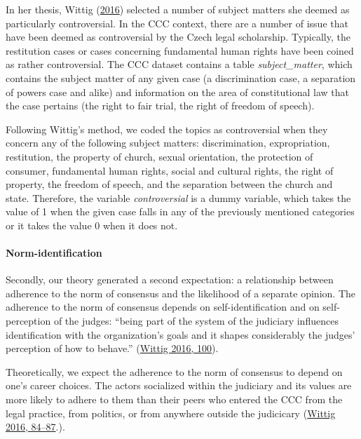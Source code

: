 \documentclass[
  11pt,
]{article}
\begin{document}
In her thesis, Wittig
(\protect\hyperlink{ref-wittigOccurrenceSeparateOpinions2016}{2016})
selected a number of subject matters she deemed as particularly
controversial. In the CCC context, there are a number of issue that have
been deemed as controversial by the Czech legal scholarship. Typically,
the restitution cases or cases concerning fundamental human rights have
been coined as rather controversial. The CCC dataset contains a table
\emph{subject\_matter}, which contains the subject matter of any given
case (a discrimination case, a separation of powers case and alike) and
information on the area of constitutional law that the case pertains
(the right to fair trial, the right of freedom of speech).

Following Wittig's method, we coded the topics as controversial when
they concern any of the following subject matters: discrimination,
expropriation, restitution, the property of church, sexual orientation,
the protection of consumer, fundamental human rights, social and
cultural rights, the right of property, the freedom of speech, and the
separation between the church and state. Therefore, the variable
\emph{controversial} is a dummy variable, which takes the value of 1
when the given case falls in any of the previously mentioned categories
or it takes the value 0 when it does not.

\hypertarget{norm-identification}{%
\paragraph*{Norm-identification}\label{norm-identification}}

Secondly, our theory generated a second expectation: a relationship
between adherence to the norm of consensus and the likelihood of a
separate opinion. The adherence to the norm of consensus depends on
self-identification and on self-perception of the judges: ``being part
of the system of the judiciary influences identification with the
organization's goals and it shapes considerably the judges' perception
of how to behave.''
(\protect\hyperlink{ref-wittigOccurrenceSeparateOpinions2016}{Wittig
2016, 100}).

Theoretically, we expect the adherence to the norm of consensus to
depend on one's career choices. The actors socialized within the
judiciary and its values are more likely to adhere to them than their
peers who entered the CCC from the legal practice, from politics, or
from anywhere outside the judicicary
(\protect\hyperlink{ref-wittigOccurrenceSeparateOpinions2016}{Wittig
2016, 84--87}.).
\end{document}
